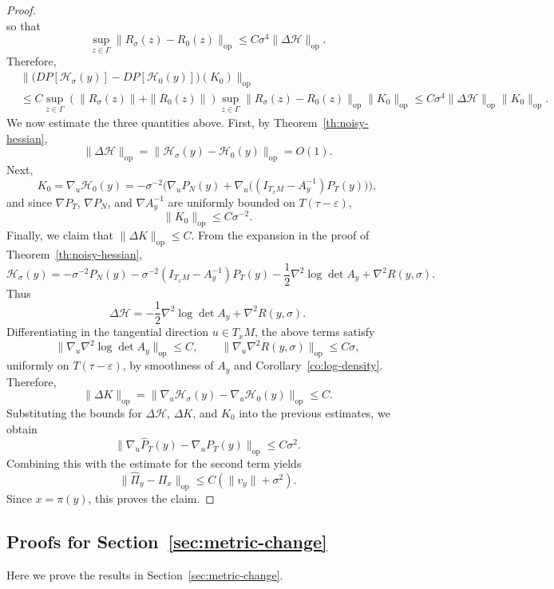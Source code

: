 \documentclass[11pt]{article}
\theoremstyle{plain}
\theoremstyle{definition}
\begin{document}
\begin{proof}
\[\]
so that
\[
\sup_{z\in\Gamma}\|R_\sigma(z)-R_0(z)\|_{\mathrm{op}}
\le
C\sigma^4\|\Delta \mathcal H\|_{\mathrm{op}}.
\]
Therefore,
\begin{align*}
&\big\|
\big(DP[\mathcal H_\sigma(y)]-DP[\mathcal H_0(y)]\big)(K_0)
\big\|_{\mathrm{op}}\\
&\le
C\sup_{z\in\Gamma}(\|R_\sigma(z)\|+\|R_0(z)\|)\sup_{z\in\Gamma}\|R_\sigma(z)-R_0(z)\|_{\mathrm{op}}\|K_0\|_{\mathrm{op}}
\le
C\sigma^4\|\Delta \mathcal H\|_{\mathrm{op}}\|K_0\|_{\mathrm{op}}.
\end{align*}
We now estimate the three quantities above. First, by Theorem~\ref{th:noisy-hessian},
\[
\|\Delta \mathcal H\|_{\mathrm{op}}
=
\|\mathcal H_\sigma(y)-\mathcal H_0(y)\|_{\mathrm{op}}
=
O(1).
\]
Next,
\[
K_0
=
\nabla_u\mathcal H_0(y)
=
-\sigma^{-2}\Big(\nabla_uP_N(y)+\nabla_u \big((I_{T_xM}-A_y^{-1})P_T(y)\big)\Big),
\]
and since $\nabla P_T$, $\nabla P_N$, and $\nabla A_y^{-1}$ are uniformly bounded on $T(\tau-\varepsilon)$,
\[
\|K_0\|_{\mathrm{op}}\le C\sigma^{-2}.
\]
Finally, we claim that $\|\Delta K\|_{\mathrm{op}} \le C$. From the expansion in the proof of
Theorem~\ref{th:noisy-hessian},
\[
\mathcal H_\sigma(y)
=
-\sigma^{-2}P_N(y)
-\sigma^{-2}(I_{T_xM}-A_y^{-1})P_T(y)
-\frac12\nabla^2\log\det A_y
+\nabla^2R(y,\sigma).
\]
Thus
\[
\Delta \mathcal H 
=
-\frac12\nabla^2\log\det A_y
+\nabla^2R(y,\sigma).
\]
Differentiating in the tangential direction $u\in T_xM$, the above terms satisfy
\[
\|\nabla_u\nabla^2\log\det A_y\|_{\mathrm{op}} \le C,
\qquad
\|\nabla_u\nabla^2R(y,\sigma)\|_{\mathrm{op}} \le C\sigma,
\]
uniformly on $T(\tau-\varepsilon)$, by smoothness of $A_y$ and
Corollary~\ref{co:log-density}. Therefore,
\[
\|\Delta K\|_{\mathrm{op}}
=
\|\nabla_u\mathcal H_\sigma(y)-\nabla_u\mathcal H_0(y)\|_{\mathrm{op}}
\le C.
\]
Substituting the bounds for $\Delta \mathcal H$, $\Delta K$, and $K_0$ into the previous estimates, we obtain
\[
\|\nabla_u\widehat P_T(y)-\nabla_uP_T(y)\|_{\mathrm{op}}
\le C\sigma^2.
\]
Combining this with the estimate for the second term yields
\[
\|\widehat\Pi_y-\Pi_x\|_{\mathrm{op}}
\le
C(\|v_y\|+\sigma^2).
\]
Since $x=\pi(y)$, this proves the claim.
\end{proof}


\subsection{Proofs for Section~\ref{sec:metric-change}}\label{sec:pf-metric}
Here we prove the results in Section~\ref{sec:metric-change}.
\end{document}
